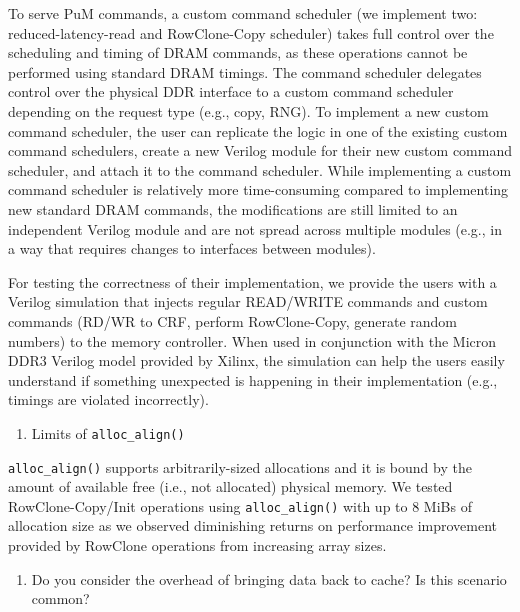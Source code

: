 To serve PuM commands, a custom command scheduler (we implement two: reduced-latency-read and RowClone-Copy scheduler) takes full control over the scheduling and timing of DRAM commands, as these operations cannot be performed using standard DRAM timings. The command scheduler delegates control over the physical DDR interface to a custom command scheduler depending on the request type (e.g., copy, RNG). To implement a new custom command scheduler, the user can replicate the logic in one of the existing custom command schedulers, create a new Verilog module for their new custom command scheduler, and attach it to the command scheduler. While implementing a custom command scheduler is relatively more time-consuming compared to implementing new standard DRAM commands, the modifications are still limited to an independent Verilog module and are not spread across multiple modules (e.g., in a way that requires changes to interfaces between modules).

For testing the correctness of their implementation, we provide the users with a Verilog simulation that injects regular READ/WRITE commands and custom commands (RD/WR to CRF, perform RowClone-Copy, generate random numbers) to the memory controller. When used in conjunction with the Micron DDR3 Verilog model provided by Xilinx, the simulation can help the users easily understand if something unexpected is happening in their implementation (e.g., timings are violated incorrectly).


\bigbreak
\begin{tcolorbox}
    \begin{enumerate}[label=R1/\arabic*]
        \addtocounter{enumi}{1}
        \item \label{q:r1q2} Limits of \texttt{alloc\_align()}
    \end{enumerate}
\end{tcolorbox} 

\texttt{alloc\_align()} supports arbitrarily-sized allocations and it is bound by the amount of available free (i.e., not allocated) physical memory. We tested RowClone-Copy/Init operations using \texttt{alloc\_align()} with up to 8 MiBs of allocation size as we observed diminishing returns on performance improvement provided by RowClone operations from increasing array sizes.


\bigbreak
\begin{tcolorbox}
    \begin{enumerate}[label=R1/\arabic*]
        \addtocounter{enumi}{2}
        \item \label{q:r1q3} Do you consider the overhead of bringing data back to cache? Is this scenario common?
    \end{enumerate}
\end{tcolorbox} 

